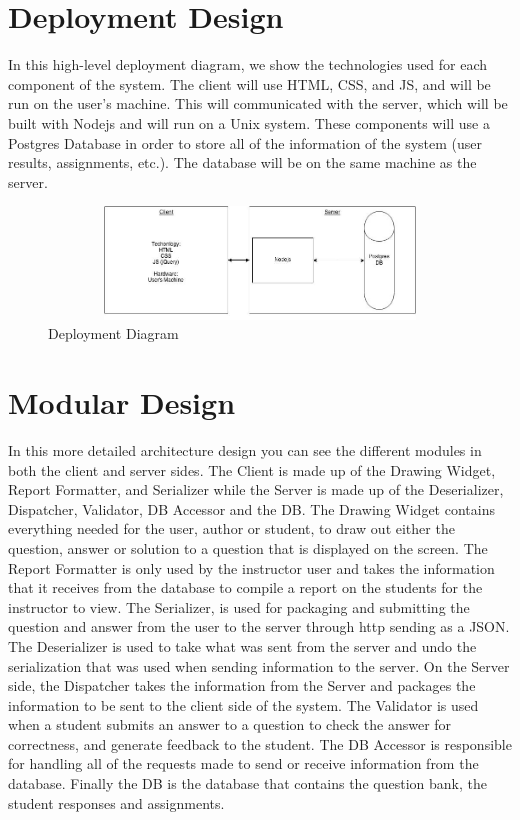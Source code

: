 \chapter{Deployment Design}
      In this high-level deployment diagram, we show the technologies used for each component of the system. The client will use HTML, CSS, and JS, and will be run on the user’s machine. This will communicated with the server, which will be built with Nodejs and will run on a Unix system. These components will use a Postgres Database in order to store all of the information of the system (user results, assignments, etc.). The database will be on the same machine as the server.
                        \begin{figure}[H]
            \centerline{\includegraphics[height=3cm, width=12cm]{Deployment.jpg}}
            \caption{Deployment Diagram}
    \end{figure}
    
\chapter{Modular Design}
In this more detailed architecture design you can see the different modules in both the client and server sides.  The Client is made up of the Drawing Widget, Report Formatter, and Serializer while the Server is made up of the Deserializer, Dispatcher, Validator, DB Accessor and the DB.  The Drawing Widget contains everything needed for the user, author or student, to draw out either the question, answer or solution to a question that is displayed on the screen.  The Report Formatter is only used by the instructor user and takes the information that it receives from the database to compile a report on the students for the instructor to view.  The Serializer, is used for packaging and submitting the question and answer from the user to the server through http sending as a JSON.  The Deserializer is used to take what was sent from the server and undo the serialization that was used when sending information to the server.  On the Server side, the Dispatcher takes the information from the Server and packages the information to be sent to the client side of the system.  The Validator is used when a student submits an answer to a question to check the answer for correctness, and generate feedback to the student.  The DB Accessor is responsible for handling all of the requests made to send or receive information from the database.  Finally the DB is the database that contains the question bank, the student responses and assignments.    
 
